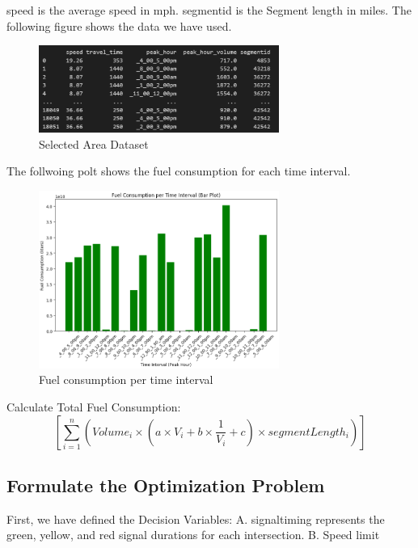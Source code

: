 \newline speed is the average speed in mph.
\newline segmentid is the Segment length in miles.
\newline
\newline
The following figure shows the data we have used.
\newline
\begin{figure}[h]
    \centering
    \includegraphics[width=0.7\textwidth]{figures/data_used_to_calculate_Total_Fuel_Consumption_For_each_road_segment.PNG}
    \caption{Selected Area Dataset}
    \label{fig:Selected Area Dataset}
\end{figure}
\newline
The follwoing polt shows the fuel consumption for each time interval.
\newline
\begin{figure}[h]
    \centering
    \includegraphics[width=0.7\textwidth]{figures/Fuel_consumption_per_time_interval.PNG}
    \caption{Fuel consumption per time interval}
    \label{fig:Selected Area Dataset}
\end{figure}
\newline
Calculate Total Fuel Consumption:
\newline
$$[\sum_{i=1}^{n}(Volume_{i} \times (a\times V_{i}+b \times \frac{1}{V_{i}}+c) \times segment Length_{i})]$$
\newline
\subsection{Formulate the Optimization Problem}
First, we have defined the Decision Variables: 
\newline A. signaltiming represents the green, yellow, and red signal durations for each intersection.
\newline B. Speed limit













